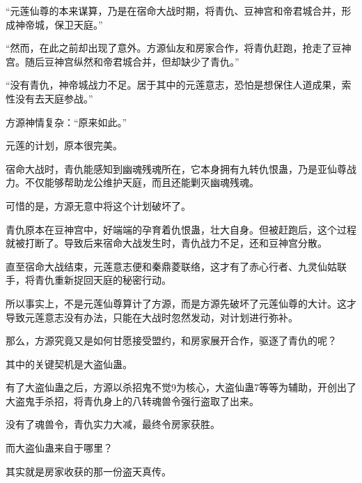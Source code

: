 \begin{this_body}
“元莲仙尊的本来谋算，乃是在宿命大战时期，将青仇、豆神宫和帝君城合并，形成神帝城，保卫天庭。”

“然而，在此之前却出现了意外。方源仙友和房家合作，将青仇赶跑，抢走了豆神宫。随后豆神宫纵然和帝君城合并，但却缺少了青仇。”

“没有青仇，神帝城战力不足。居于其中的元莲意志，恐怕是想保住人道成果，索性没有去天庭参战。”

方源神情复杂：“原来如此。”

元莲的计划，原本很完美。

宿命大战时，青仇能感知到幽魂残魂所在，它本身拥有九转仇恨蛊，乃是亚仙尊战力。不仅能够帮助龙公维护天庭，而且还能剿灭幽魂残魂。

可惜的是，方源无意中将这个计划破坏了。

青仇原本在豆神宫中，好端端的孕育着仇恨蛊，壮大自身。但被赶跑后，这个过程就被打断了。导致后来宿命大战发生时，青仇战力不足，还和豆神宫分散。

直至宿命大战结束，元莲意志便和秦鼎菱联络，这才有了赤心行者、九灵仙姑联手，将青仇重新捉回天庭的秘密行动。

所以事实上，不是元莲仙尊算计了方源，而是方源先破坏了元莲仙尊的大计。这才导致元莲意志没有办法，只能在大战时忽然发动，对计划进行弥补。

那么，方源究竟又是如何甘愿接受盟约，和房家展开合作，驱逐了青仇的呢？

其中的关键契机是大盗仙蛊。

有了大盗仙蛊之后，方源以杀招鬼不觉9为核心，大盗仙蛊7等等为辅助，开创出了大盗鬼手杀招，将青仇身上的八转魂兽令强行盗取了出来。

没有了魂兽令，青仇实力大减，最终令房家获胜。

而大盗仙蛊来自于哪里？

其实就是房家收获的那一份盗天真传。

\end{this_body}

